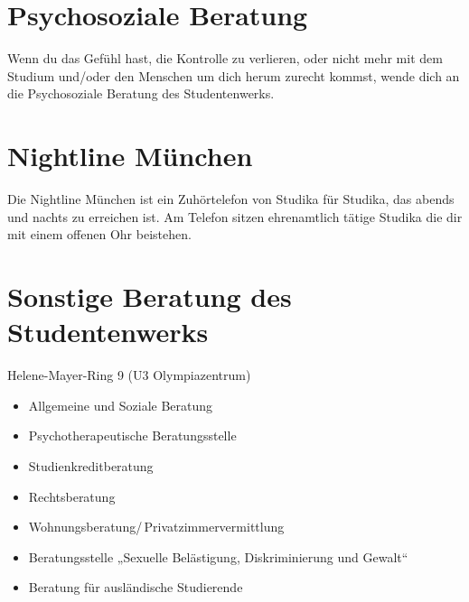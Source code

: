 \begin{urlList}
\end{urlList}

\section{Psychosoziale Beratung}

Wenn du das Gefühl hast, die Kontrolle zu verlieren, oder nicht mehr mit
dem Studium und/oder den Menschen um dich herum zurecht kommst, wende dich an die Psychosoziale Beratung des Studentenwerks.

\begin{urlList}
\end{urlList}

\section{Nightline München}

Die Nightline München ist ein Zuhörtelefon von Studika für Studika,
das abends und nachts zu erreichen ist. Am Telefon sitzen ehrenamtlich
tätige Studika die dir mit einem offenen Ohr beistehen.

\begin{urlList}
\end{urlList}


\section{Sonstige Beratung des Studentenwerks}
Helene-Mayer-Ring 9 (U3 Olympiazentrum)

\begin{itemize}
	\item Allgemeine und Soziale Beratung
	\item Psychotherapeutische Beratungsstelle
	\item Studienkreditberatung
	\item Rechtsberatung
	\item Wohnungsberatung/\,Privatzimmervermittlung
	\item Beratungsstelle „Sexuelle Belästigung, Diskriminierung und Gewalt“
	\item Beratung für ausländische Studierende
\end{itemize}

